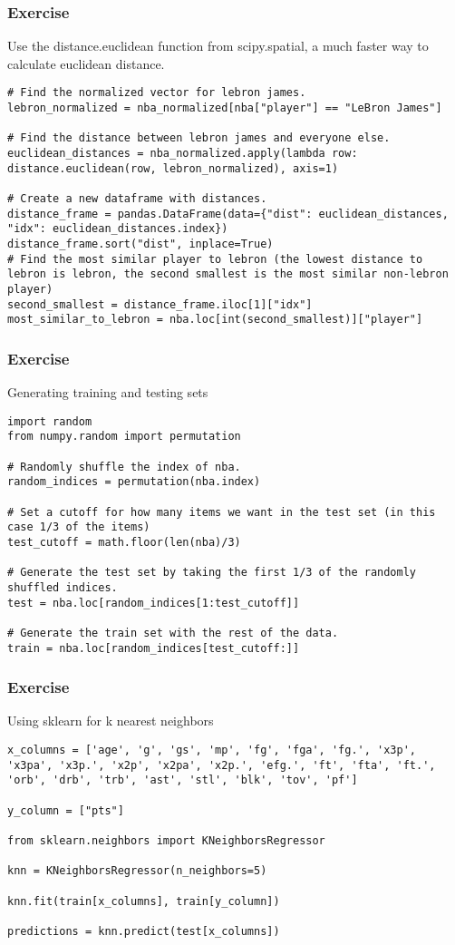 \begin{frame}[fragile]\frametitle{Exercise}
Use the distance.euclidean function from scipy.spatial, a much faster way to calculate euclidean distance.
\begin{lstlisting}
# Find the normalized vector for lebron james.
lebron_normalized = nba_normalized[nba["player"] == "LeBron James"]

# Find the distance between lebron james and everyone else.
euclidean_distances = nba_normalized.apply(lambda row: distance.euclidean(row, lebron_normalized), axis=1)

# Create a new dataframe with distances.
distance_frame = pandas.DataFrame(data={"dist": euclidean_distances, "idx": euclidean_distances.index})
distance_frame.sort("dist", inplace=True)
# Find the most similar player to lebron (the lowest distance to lebron is lebron, the second smallest is the most similar non-lebron player)
second_smallest = distance_frame.iloc[1]["idx"]
most_similar_to_lebron = nba.loc[int(second_smallest)]["player"]
\end{lstlisting}
\end{frame}

\begin{frame}[fragile]\frametitle{Exercise}
Generating training and testing sets
\begin{lstlisting}
import random
from numpy.random import permutation

# Randomly shuffle the index of nba.
random_indices = permutation(nba.index)

# Set a cutoff for how many items we want in the test set (in this case 1/3 of the items)
test_cutoff = math.floor(len(nba)/3)

# Generate the test set by taking the first 1/3 of the randomly shuffled indices.
test = nba.loc[random_indices[1:test_cutoff]]

# Generate the train set with the rest of the data.
train = nba.loc[random_indices[test_cutoff:]]
\end{lstlisting}
\end{frame}

\begin{frame}[fragile]\frametitle{Exercise}
Using sklearn for k nearest neighbors
\begin{lstlisting}
x_columns = ['age', 'g', 'gs', 'mp', 'fg', 'fga', 'fg.', 'x3p', 'x3pa', 'x3p.', 'x2p', 'x2pa', 'x2p.', 'efg.', 'ft', 'fta', 'ft.', 'orb', 'drb', 'trb', 'ast', 'stl', 'blk', 'tov', 'pf']

y_column = ["pts"]

from sklearn.neighbors import KNeighborsRegressor

knn = KNeighborsRegressor(n_neighbors=5)

knn.fit(train[x_columns], train[y_column])

predictions = knn.predict(test[x_columns])
\end{lstlisting}
\end{frame}

